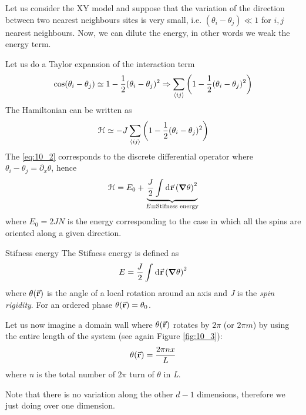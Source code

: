 \documentclass[../main/main.tex]{subfiles}
\begin{document}
Let us consider the XY model and suppose that the variation of the direction between two nearest neighbours sites is very small, i.e. \( (\theta _i - \theta _j) \ll 1 \) for \( i,j \) nearest neighbours.
 Now, we can dilute the energy, in other words we weak the energy term.

Let us do a Taylor expansion of the interaction term
\begin{equation}
  \cos (\theta _i - \theta _j) \simeq 1 - \frac{1}{2} (\theta _i - \theta _j)^2 \Rightarrow \sum_{\expval{ij} }^{}  \qty(1 - \frac{1}{2} (\theta _i - \theta _j)^2)
  \label{eq:10_2}
\end{equation}
The Hamiltonian can be written as
\begin{equation}
  \mathcal{H} \simeq - J \sum_{\expval{ij} }^{} \qty(1- \frac{1}{2}(\theta _i - \theta _j)^2)
\end{equation}
The \eqref{eq:10_2} corresponds to the discrete differential operator where
\( \theta _i - \theta _j = \partial_x{\theta }  \),
hence
\begin{equation}
  \mathcal{H} = E_0 + \underbrace{\frac{J}{2} \int_{}^{} \dd[]{\va{r}} \qty(\grad \theta )^2 }_{E \equiv \text{Stifness energy}}
\end{equation}
where \( E_0 = 2JN \) is the energy corresponding to the case in which all the spins are oriented along a given direction.

\begin{definition}{Stifness energy}{}
  The Stifness energy is defined as
  \begin{equation}
    E = \frac{J}{2} \int_{}^{} \dd[]{\va{r}} \qty(\grad \theta )^2
  \end{equation}
where \( \theta (\va{r})  \) is the angle of a local rotation around an axis and \emph{J} is the \emph{spin rigidity}. For an ordered phase \( \theta (\va{r}) = \theta _0 \).
\end{definition}

Let us now imagine a domain wall where \(\theta (\va{r})  \)  rotates by \( 2 \pi  \) (or \( 2 \pi m \)) by using the entire length of the system (see again Figure \ref{fig:10_3}):
\begin{equation*}
  \theta (\va{r}) = \frac{2 \pi n x}{L}
\end{equation*}
where \emph{n} is the total number of \( 2 \pi  \) turn of \( \theta  \) in \emph{L}. 
\begin{remark}
Note that there is no variation along the other \( d-1 \) dimensions, therefore we just doing over one dimension.
\end{remark}
\end{document}
